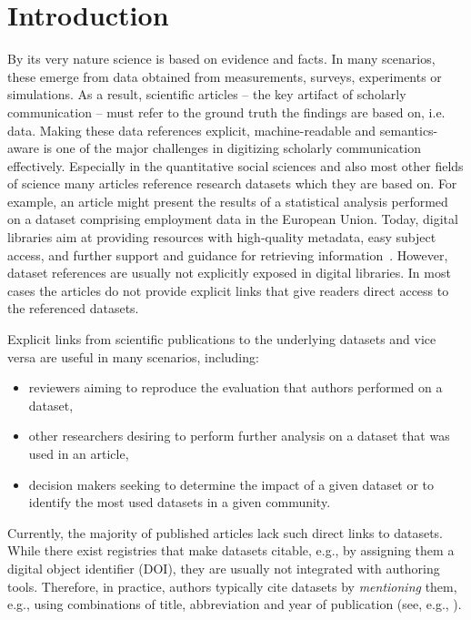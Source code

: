 \documentclass{IOS-Book-Article}
\begin{document}
\section{Introduction}

By its very nature science is based on evidence and facts.
In many scenarios, these emerge from data obtained from measurements, surveys, experiments or simulations.
As a result, scientific articles -- the key artifact of scholarly communication -- must refer to the ground truth the findings are based on, i.e. data.
Making these data references explicit, machine-readable and semantics-aware is one of the major challenges in digitizing scholarly communication effectively.
Especially in the quantitative social sciences and also most other fields of science many articles reference research datasets which they are based on.
For example, an article might present the results of a statistical analysis performed on a dataset comprising employment data in the European Union.
Today, digital libraries aim at providing resources with high-quality metadata, easy subject access, and further support and guidance for retrieving information~\citep{Hienert2015}. 
However, dataset references are usually not explicitly exposed in digital libraries.
In most cases the articles do not provide explicit links that give readers direct access to the referenced datasets. 

Explicit links from scientific publications to the underlying datasets and vice versa are useful in many scenarios, including:
\begin{itemize}
	\item reviewers aiming to reproduce the evaluation that authors performed on a dataset, 
	\item other researchers desiring to perform further analysis on a dataset that was used in an article,
	\item decision makers seeking to determine the impact of a given dataset or to identify the most used datasets in a given community.
\end{itemize}

Currently, the majority of published articles lack such direct links to datasets.
While there exist registries that make datasets citable, e.g., by assigning them a digital object identifier (DOI), they are usually not integrated with authoring tools.
Therefore, in practice, authors typically cite datasets by \emph{mentioning} them, e.g., using  
combinations of title, abbreviation and year of publication (see, e.g., \citet{Mathiak2015}).  
\end{document}
